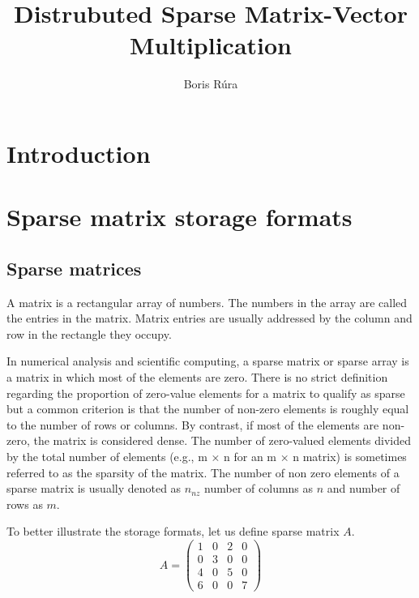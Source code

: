 \documentclass[thesis=M,english]{FITthesis}[2019/12/23]
\title{Distrubuted Sparse Matrix-Vector Multiplication}
\author{Boris Rúra} %
\begin{document}
\tableofcontents

\chapter{Introduction}


\chapter{Sparse matrix storage formats}


\section{Sparse matrices}

A matrix is a rectangular array of numbers. The numbers in the array
are called the entries in the matrix. \cite{anton14} Matrix entries are usually addressed
by the column and row in the rectangle they occupy.

In numerical analysis and scientific computing, a sparse matrix or sparse array
is a matrix in which most of the elements are zero. There is no strict definition
regarding the proportion of zero-value elements for a matrix to qualify as sparse
but a common criterion is that the number of non-zero elements is roughly equal
to the number of rows or columns. By contrast, if most of the elements are non-zero,
the matrix is considered dense.
The number of zero-valued elements divided by the total number of elements (e.g., m × n for an m × n matrix) is sometimes referred to as the sparsity of the matrix.
\cite{efficientSDMM} The number of non zero elements of a sparse matrix is usually denoted
as $n_{nz}$ number of columns as $n$ and number of rows as $m$.

To better illustrate the storage formats, let us define sparse matrix $A$.
\begin{equation*}
	A =
	\begin{pmatrix}
		1 & 0 & 2 & 0 \\
		0 & 3 & 0 & 0 \\
		4 & 0 & 5 & 0 \\
		6 & 0 & 0 & 7
	\end{pmatrix}
\end{equation*}
\end{document}
